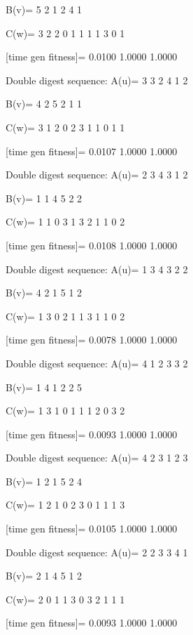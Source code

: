 B(v)=
     5     2     1     2     4     1

C(w)=
     3     2     2     0     1     1     1     1     3     0     1

[time gen fitness]=
    0.0100    1.0000    1.0000

Double digest sequence:
A(u)=
     3     3     2     4     1     2

B(v)=
     4     2     5     2     1     1

C(w)=
     3     1     2     0     2     3     1     1     0     1     1

[time gen fitness]=
    0.0107    1.0000    1.0000

Double digest sequence:
A(u)=
     2     3     4     3     1     2

B(v)=
     1     1     4     5     2     2

C(w)=
     1     1     0     3     1     3     2     1     1     0     2

[time gen fitness]=
    0.0108    1.0000    1.0000

Double digest sequence:
A(u)=
     1     3     4     3     2     2

B(v)=
     4     2     1     5     1     2

C(w)=
     1     3     0     2     1     1     3     1     1     0     2

[time gen fitness]=
    0.0078    1.0000    1.0000

Double digest sequence:
A(u)=
     4     1     2     3     3     2

B(v)=
     1     4     1     2     2     5

C(w)=
     1     3     1     0     1     1     1     2     0     3     2

[time gen fitness]=
    0.0093    1.0000    1.0000

Double digest sequence:
A(u)=
     4     2     3     1     2     3

B(v)=
     1     2     1     5     2     4

C(w)=
     1     2     1     0     2     3     0     1     1     1     3

[time gen fitness]=
    0.0105    1.0000    1.0000

Double digest sequence:
A(u)=
     2     2     3     3     4     1

B(v)=
     2     1     4     5     1     2

C(w)=
     2     0     1     1     3     0     3     2     1     1     1

[time gen fitness]=
    0.0093    1.0000    1.0000

